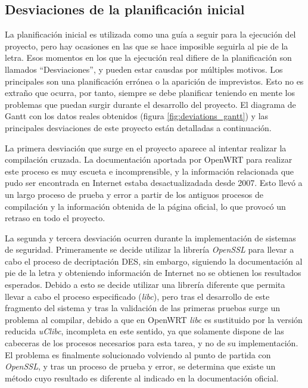 \documentclass[12pt]{article}
\begin{document}
    \subsection{Desviaciones de la planificación inicial}
        La planificación inicial es utilizada como una guía a seguir para la ejecución del proyecto, pero hay ocasiones en las que se hace imposible seguirla al pie de la letra. Esos momentos en los que la ejecución real difiere de la planificación son llamados ``Desviaciones'', y pueden estar causdas por múltiples motivos. Los principales son una planificación errónea o la aparición de imprevistos. Esto no es extraño que ocurra, por tanto, siempre se debe planificar teniendo en mente los problemas que puedan surgir durante el desarrollo del proyecto. El diagrama de Gantt con los datos reales obtenidos (figura \ref{fig:deviations_gantt}) y las principales desviaciones de este proyecto están detalladas a continuación.

        La primera desviación que surge en el proyecto aparece al intentar realizar la compilación cruzada. La documentación aportada por OpenWRT para realizar este proceso es muy escueta e incomprensible, y la información relacionada que pudo ser encontrada en Internet estaba desactualizadada desde 2007. Esto llevó a un largo proceso de prueba y error a partir de los antiguos procesos de compilación y la información obtenida de la página oficial, lo que provocó un retraso en todo el proyecto.

        La segunda y tercera desviación ocurren durante la implementación de sistemas de seguridad. Primeramente se decide utilizar la librería \textit{OpenSSL} para llevar a cabo el proceso de decriptación DES, sin embargo, siguiendo la documentación al pie de la letra y obteniendo información de Internet no se obtienen los resultados esperados. Debido a esto se decide utilizar una librería diferente que permita llevar a cabo el proceso especificado (\textit{libc}), pero tras el desarrollo de este fragmento del sistema y tras la validación de las primeras pruebas surge un problema al compilar, debido a que en OpenWRT \textit{libc} es sustituido por la versión reducida \textit{uClibc}, incompleta en este sentido, ya que solamente dispone de las cabeceras de los procesos necesarios para esta tarea, y no de su implementación. El problema es finalmente solucionado volviendo al punto de partida con \textit{OpenSSL}, y tras un proceso de prueba y error, se determina que existe un método cuyo resultado es diferente al indicado en la documentación oficial.
\end{document}
